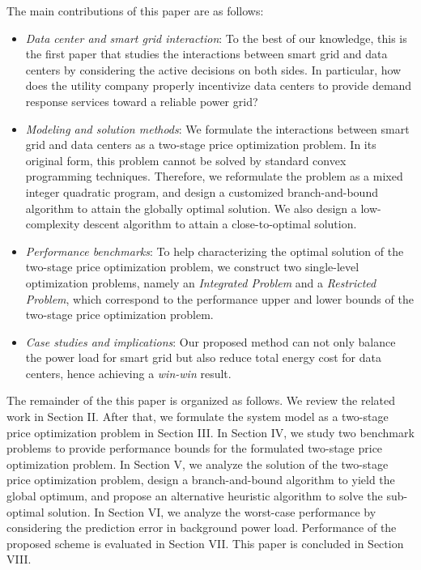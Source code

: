 \documentclass[journal]{IEEEtran}
\begin{document}
	The main contributions of this paper are as follows:
	\begin{itemize}
		\item \textit{Data center and smart grid interaction}: To the best of our knowledge, this is the first paper that studies the interactions between smart grid and data centers by considering the active decisions on both sides. In particular, how does the utility company properly incentivize data centers to provide demand response services toward a reliable power grid?
		\item \textit{Modeling and solution methods}: We formulate the interactions between smart grid and data centers as a two-stage price optimization problem. In its original form, this problem cannot be solved by standard convex programming techniques. Therefore, we reformulate the problem as a mixed integer quadratic program, and design a customized branch-and-bound algorithm to attain the globally optimal solution. We also design a low-complexity descent algorithm to attain a close-to-optimal solution.
		\item \textit{Performance benchmarks}: To help characterizing the optimal solution of the two-stage price optimization problem, we construct two single-level optimization problems, namely an \emph{Integrated Problem} and a \emph{Restricted Problem}, which correspond to the performance upper and lower bounds of the two-stage price optimization problem.
		\item \textit{Case studies and implications}: Our proposed method can not only balance the power load for smart grid but also reduce total energy cost for data centers, hence achieving a \emph{win-win} result. 
	\end{itemize}
	
	
	The remainder of the this paper is organized as follows. We review the related work in Section II. After that, we formulate the system model as a two-stage price optimization problem in Section III. In Section IV, we study two benchmark problems to provide performance bounds for the formulated two-stage price optimization problem. In Section V, we analyze the solution of the two-stage price optimization problem, design a branch-and-bound algorithm to yield the global optimum, and propose an alternative heuristic algorithm to solve the sub-optimal solution. In Section VI, we analyze the worst-case performance by considering the prediction error in background power load. Performance of the proposed scheme is evaluated in Section VII. This paper is concluded in Section VIII.
	
\end{document}
